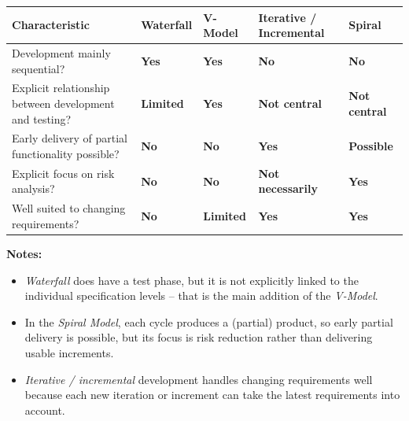 \documentclass[11pt,a4paper]{article}
\newcommand{\yes}{\textcolor{good}{\textbf{Yes}}}
\newcommand{\no}{\textcolor{bad}{\textbf{No}}}
\newcommand{\partly}[1]{\textcolor{mid}{\textbf{#1}}}
\begin{document}
\begin{center}
\renewcommand{\arraystretch}{1.35}
\small
\begin{tabularx}{\textwidth}{@{}>{\raggedright\arraybackslash}p{4.3cm}
  >{\centering\arraybackslash}X >{\centering\arraybackslash}X
  >{\centering\arraybackslash}X >{\centering\arraybackslash}X@{}}
\toprule
\textbf{Characteristic} & \textbf{Waterfall} & \textbf{V-Model} &
\textbf{Iterative / Incremental} & \textbf{Spiral} \\
\midrule
Development mainly sequential? & \yes & \yes & \no & \no \\
Explicit relationship between development and testing? &
  \partly{Limited} & \yes & \partly{Not central} & \partly{Not central} \\
Early delivery of partial functionality possible? &
  \no & \no & \yes & \partly{Possible} \\
Explicit focus on risk analysis? & \no & \no & \partly{Not necessarily} & \yes \\
Well suited to changing requirements? &
  \no & \partly{Limited} & \yes & \yes \\
\bottomrule
\end{tabularx}
\end{center}

\textbf{Notes:}
\begin{itemize}[itemsep=0.1em]
  \item \emph{Waterfall} does have a test phase, but it is not explicitly
        linked to the individual specification levels -- that is the main
        addition of the \emph{V-Model}.
  \item In the \emph{Spiral Model}, each cycle produces a (partial)
        product, so early partial delivery is possible, but its focus is
        risk reduction rather than delivering usable increments.
  \item \emph{Iterative / incremental} development handles changing
        requirements well because each new iteration or increment can take
        the latest requirements into account.
\end{itemize}
\end{document}
